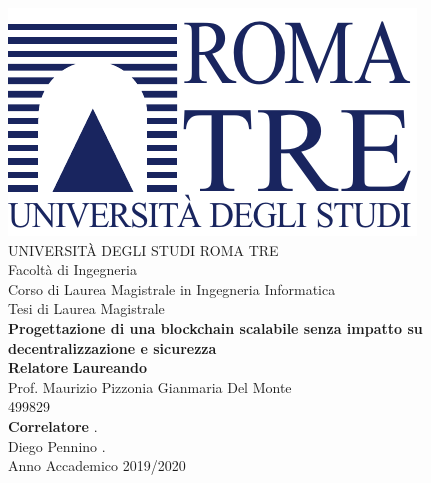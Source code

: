 \thispagestyle{empty}
\begin{center}
	\vspace{10mm}
	{\includegraphics[width=0.4 \linewidth]{img/uniroma3-logo}} \\
	\vspace{10mm}
	{\Large UNIVERSIT\`A DEGLI STUDI ROMA TRE} \\
	\vspace{5mm}
	{\Large Facolt\`a di Ingegneria} \\
	{\Large Corso di Laurea Magistrale in Ingegneria Informatica} \\
	\vspace{15mm}
	{\Large Tesi di Laurea Magistrale} \\
	\vspace{10mm}
	{\Large \textbf{Progettazione di una blockchain scalabile senza impatto su decentralizzazione e sicurezza}} \\
	\vspace{4 cm}
	\noindent \textbf{Relatore} \hfill \textbf{Laureando} \\
	\noindent Prof. Maurizio Pizzonia \hfill Gianmaria Del Monte \\
	\hfill 499829 \\
	\noindent  \textbf{Correlatore} \hfill {.}\\
	\noindent Diego Pennino \hfill {.}\\
	\vfill
	{\large Anno Accademico 2019/2020} \\
\end{center}
\newpage